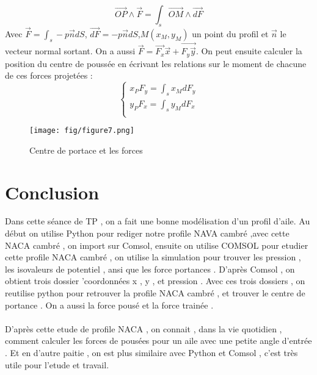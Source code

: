 \documentclass[a4paper,10pt]{report} %
\begin{document}
$$\vec{OP}\land\vec{F}=\int_{s}\vec{OM}\land\vec{dF} $$
Avec $\vec{F}=\int_{s}-p\vec{n}dS$, $\vec{dF}=-p\vec{n}dS$,$M(x_{M},y_{M})$ un point du profil et $\vec{n}$ le vecteur normal sortant.
On a aussi $\vec{F}=\vec{F_{x}}\vec{x}+\vec{F_{y}\vec{y}}$. On peut ensuite calculer la position du centre de poussée en écrivant les relations sur le moment de chacune de ces forces projetées : 
$$\left\{
\begin{aligned}
x_{P}F_{y}=\int_{s}x_{M}dF_{y} \\
y_{P}F_{x}=\int_{s}y_{M}dF_{x}\\
\end{aligned}
\right.
$$


\begin{figure}[h]
\centering
\texttt{[image: fig/figure7.png]}
\caption{	Centre de portace et les forces}
\end{figure}


\chapter{Conclusion} 
Dans cette séance de TP , on a fait une bonne modélisation d'un profil d'aile. Au début on utilise Python pour rediger notre profile NAVA cambré ,avec cette NACA cambré , on import sur Comsol, ensuite on utilise COMSOL pour etudier cette profile NACA cambré , on utilise la simulation pour trouver les pression , les isovaleurs de potentiel , ansi que les force portances . D'après Comsol , on obtient trois dossier 'coordonnées x , y , et pression . Avec ces trois dossiers , on reutilise python pour retrouver la profile NACA cambré , et trouver le centre de portance . On  a aussi la force pousé et la force trainée .
\\
\\ 

D'après cette etude de profile NACA , on connait , dans la vie quotidien , comment calculer les forces de pousées pour un aile avec une petite angle d'entrée . Et en d'autre paitie , on est plus similaire avec Python et Comsol , c'est très utile pour l'etude et travail. 
\end{document}
